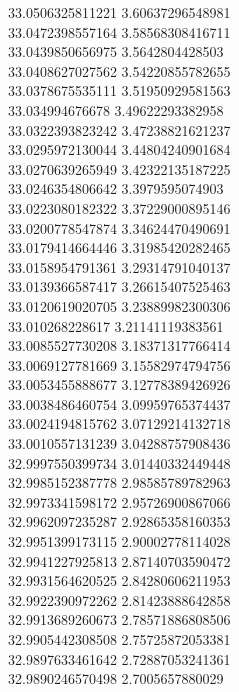 {33.0506325811221	3.60637296548981\\
33.0472398557164	3.58568308416711\\
33.0439850656975	3.5642804428503\\
33.0408627027562	3.54220855782655\\
33.0378675535111	3.51950929581563\\
33.034994676678	3.49622293382958\\
33.0322393823242	3.47238821621237\\
33.0295972130044	3.44804240901684\\
33.0270639265949	3.42322135187225\\
33.0246354806642	3.3979595074903\\
33.0223080182322	3.37229000895146\\
33.0200778547874	3.34624470490691\\
33.0179414664446	3.31985420282465\\
33.0158954791361	3.29314791040137\\
33.0139366587417	3.26615407525463\\
33.0120619020705	3.23889982300306\\
33.010268228617	3.21141119383561\\
33.0085527730208	3.18371317766414\\
33.0069127781669	3.15582974794756\\
33.0053455888677	3.12778389426926\\
33.0038486460754	3.09959765374437\\
33.0024194815762	3.07129214132718\\
33.0010557131239	3.04288757908436\\
32.9997550399734	3.01440332449448\\
32.9985152387778	2.98585789782963\\
32.9973341598172	2.95726900867066\\
32.9962097235287	2.92865358160353\\
32.9951399173115	2.90002778114028\\
32.9941227925813	2.87140703590472\\
32.9931564620525	2.84280606211953\\
32.9922390972262	2.81423888642858\\
32.9913689260673	2.78571886808506\\
32.9905442308508	2.75725872053381\\
32.9897633461642	2.72887053241361\\
32.9890246570498	2.7005657880029\\
}
